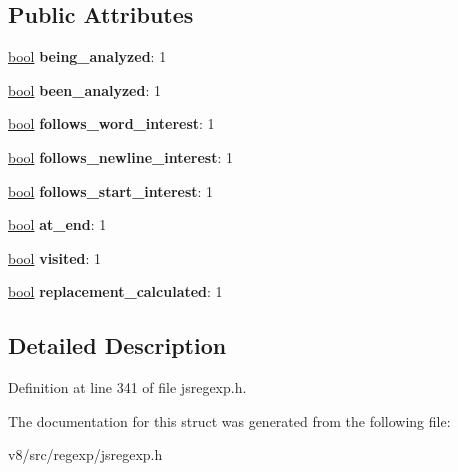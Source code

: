 \subsection*{Public Attributes}
\begin{DoxyCompactItemize}
\item 
\mbox{\label{structv8_1_1internal_1_1NodeInfo_ae29732b0dc44899a91c2df9c687f5664}} 
\mbox{\hyperlink{classbool}{bool}} {\bfseries being\+\_\+analyzed}\+: 1
\item 
\mbox{\label{structv8_1_1internal_1_1NodeInfo_a03902eddc2713d75fc3ac3a82544d736}} 
\mbox{\hyperlink{classbool}{bool}} {\bfseries been\+\_\+analyzed}\+: 1
\item 
\mbox{\label{structv8_1_1internal_1_1NodeInfo_af63a381671cda76b6608338e7e020dc5}} 
\mbox{\hyperlink{classbool}{bool}} {\bfseries follows\+\_\+word\+\_\+interest}\+: 1
\item 
\mbox{\label{structv8_1_1internal_1_1NodeInfo_aef257fa538416d9d0c8d96fc30b3f3f7}} 
\mbox{\hyperlink{classbool}{bool}} {\bfseries follows\+\_\+newline\+\_\+interest}\+: 1
\item 
\mbox{\label{structv8_1_1internal_1_1NodeInfo_a5deecfa3f3fb5e25fa9502e9b0dbb341}} 
\mbox{\hyperlink{classbool}{bool}} {\bfseries follows\+\_\+start\+\_\+interest}\+: 1
\item 
\mbox{\label{structv8_1_1internal_1_1NodeInfo_ad16dae437fa8287e274caf3854f220fd}} 
\mbox{\hyperlink{classbool}{bool}} {\bfseries at\+\_\+end}\+: 1
\item 
\mbox{\label{structv8_1_1internal_1_1NodeInfo_aab006e951efad67bfeeface9eec4094b}} 
\mbox{\hyperlink{classbool}{bool}} {\bfseries visited}\+: 1
\item 
\mbox{\label{structv8_1_1internal_1_1NodeInfo_af061bd754b39188f421fe14c3d986d88}} 
\mbox{\hyperlink{classbool}{bool}} {\bfseries replacement\+\_\+calculated}\+: 1
\end{DoxyCompactItemize}


\subsection{Detailed Description}


Definition at line 341 of file jsregexp.\+h.



The documentation for this struct was generated from the following file\+:\begin{DoxyCompactItemize}
\item 
v8/src/regexp/jsregexp.\+h\end{DoxyCompactItemize}
